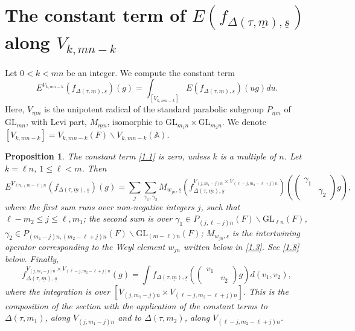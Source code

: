 \documentclass[12pts]{amsart}
\newcommand{\BA}{{\mathbb {A}}}
\newcommand{\GL}{{\mathrm{GL}}}
\newtheorem{prop}[thm]{Proposition}
\begin{document}
    	
\section{The constant term of $E(f_{\Delta(\tau,\underline{m}),\underline{s}})$ along $V_{k,mn-k}$}
	
	    	
Let $0<k<mn$ be an integer. We compute the constant term
\begin{equation}\label{1.1}
	E^{V_{k,mn-k}}(f_{\Delta(\tau,\underline{m}),\underline{s}})(g)=\int_{[V_{k,mn-k}]}E(f_{\Delta(\tau,\underline{m}),\underline{s}})(ug)du.
\end{equation}
Here, $V_{\underline{m}n}$ is the unipotent radical of the standard parabolic subgroup $P_{\underline{m}n}$ of $\GL_{mn}$, with Levi part, $M_{\underline{m}n}$, isomorphic to $\GL_{m_1n}\times \GL_{m_2n}$. We denote $[V_{k,mn-k}]=V_{k,mn-k}(F)\backslash V_{k,mn-k}(\BA)$.

\begin{prop}\label{prop 1.1}
	The constant term \eqref{1.1} is zero, unless $k$ is a multiple of $n$. Let $k=\ell n$, $1\leq \ell<m$. Then
\begin{equation}\label{1.1'}
E^{V_{\ell n,(m-\ell)n}}(f_{\Delta(\tau,\underline{m}),\underline{s}})(g)=\sum_j\sum_{\gamma_1,\gamma_2}M_{w_{jn},\underline{s}}(f^{V_{(j,m_1-j)n}\times V_{(\ell-j,m_2-\ell+j)n}}_{\Delta(\tau,\underline{m}),\underline{s}})(\begin{pmatrix}\gamma_1\\&\gamma_2\end{pmatrix}g),
\end{equation}
where the first sum runs over non-negative integers $j$, such that $\ell-m_2\leq j\leq \ell, m_1$; the second sum is over $\gamma_1\in P_{(j,\ell-j)n}(F)\backslash \GL_{\ell n}(F)$,\\
$\gamma_2\in P_{(m_1-j)n,(m_2-\ell+j)n}(F)\backslash \GL_{(m-\ell)n}(F)$; $M_{w_{jn},\underline{s}}$ is the intertwining operator corresponding to the Weyl element $w_{jn}$ written below in \eqref{1.3}. See \eqref{1.8} below. Finally, 	
$$
f^{V_{(j,m_1-j)n}\times V_{(\ell-j,m_2-\ell+j)n}}_{\Delta(\tau,\underline{m}),\underline{s}}(g)=\int f_{\Delta(\tau,\underline{m}),\underline{s}}(\begin{pmatrix}v_1\\&v_2\end{pmatrix}g)d(v_1,v_2),
$$
where the integration is over $[V_{(j,m_1-j)n}\times V_{(\ell-j,m_2-\ell+j)n}]$.
This is the composition of the section with the application of the constant terms to $\Delta(\tau,m_1)$, along $V_{(j,m_1-j)n}$ and to $\Delta(\tau,m_2)$, along $V_{(\ell-j,m_2-\ell+j)n}$. 
\end{prop}
\end{document}

